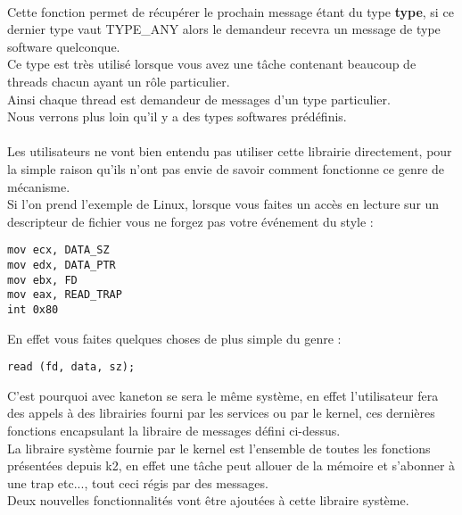 \documentclass[10pt,a4wide]{article}
\begin{document}
\paragraph{}

Cette fonction permet de r\'ecup\'erer le prochain message \'etant du type \textbf{type}, si ce dernier type vaut TYPE\_ANY alors le demandeur
recevra un message de type software quelconque.\\
Ce type est tr\`es utilis\'e lorsque vous avez une t\^ache contenant beaucoup de threads chacun ayant un r\^ole particulier.\\
Ainsi chaque thread est demandeur de messages d'un type particulier.\\
Nous verrons plus loin qu'il y a des types softwares pr\'ed\'efinis.

\paragraph{}

Les utilisateurs ne vont bien entendu pas utiliser cette librairie directement, pour la simple raison qu'ils n'ont pas envie de savoir
comment fonctionne ce genre de m\'ecanisme.\\
Si l'on prend l'exemple de Linux, lorsque vous faites un acc\`es en lecture sur un descripteur de fichier vous ne forgez pas votre
\'ev\'enement du style :
\begin{verbatim}
mov ecx, DATA_SZ
mov edx, DATA_PTR
mov ebx, FD
mov eax, READ_TRAP
int 0x80
\end{verbatim}
En effet vous faites quelques choses de plus simple du genre :
\begin{verbatim}
read (fd, data, sz);
\end{verbatim}
C'est pourquoi avec kaneton se sera le m\^eme syst\`eme, en effet l'utilisateur fera des appels \`a des librairies fourni par les services
ou par le kernel, ces derni\`eres fonctions encapsulant la libraire de messages d\'efini ci-dessus.\\
La libraire syst\`eme fournie par le kernel est l'ensemble de toutes les fonctions pr\'esent\'ees depuis k2, en effet une t\^ache peut allouer
de la m\'emoire et s'abonner \`a une trap etc..., tout ceci r\'egis par des messages.\\
Deux nouvelles fonctionnalit\'es vont \^etre ajout\'ees \`a cette libraire syst\`eme.

\paragraph{}
\end{document}
